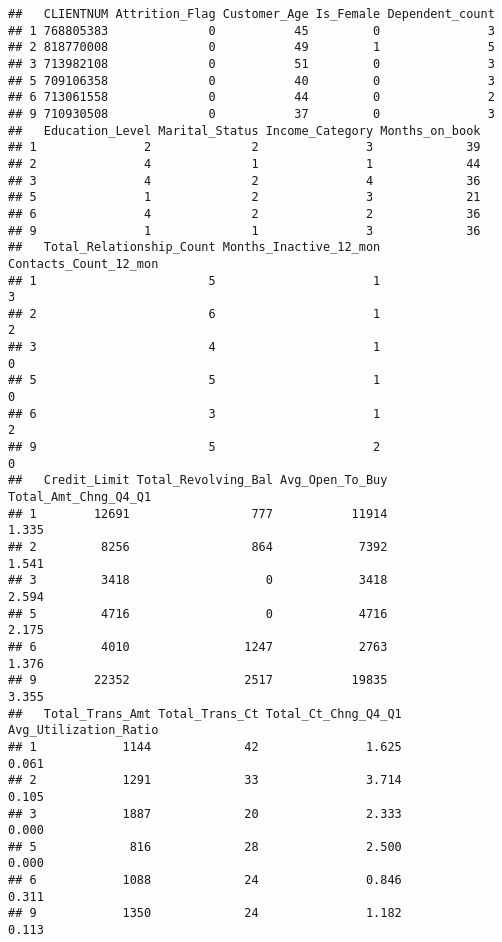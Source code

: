 \documentclass[
]{article}
\begin{document}
\begin{verbatim}
##   CLIENTNUM Attrition_Flag Customer_Age Is_Female Dependent_count
## 1 768805383              0           45         0               3
## 2 818770008              0           49         1               5
## 3 713982108              0           51         0               3
## 5 709106358              0           40         0               3
## 6 713061558              0           44         0               2
## 9 710930508              0           37         0               3
##   Education_Level Marital_Status Income_Category Months_on_book
## 1               2              2               3             39
## 2               4              1               1             44
## 3               4              2               4             36
## 5               1              2               3             21
## 6               4              2               2             36
## 9               1              1               3             36
##   Total_Relationship_Count Months_Inactive_12_mon Contacts_Count_12_mon
## 1                        5                      1                     3
## 2                        6                      1                     2
## 3                        4                      1                     0
## 5                        5                      1                     0
## 6                        3                      1                     2
## 9                        5                      2                     0
##   Credit_Limit Total_Revolving_Bal Avg_Open_To_Buy Total_Amt_Chng_Q4_Q1
## 1        12691                 777           11914                1.335
## 2         8256                 864            7392                1.541
## 3         3418                   0            3418                2.594
## 5         4716                   0            4716                2.175
## 6         4010                1247            2763                1.376
## 9        22352                2517           19835                3.355
##   Total_Trans_Amt Total_Trans_Ct Total_Ct_Chng_Q4_Q1 Avg_Utilization_Ratio
## 1            1144             42               1.625                 0.061
## 2            1291             33               3.714                 0.105
## 3            1887             20               2.333                 0.000
## 5             816             28               2.500                 0.000
## 6            1088             24               0.846                 0.311
## 9            1350             24               1.182                 0.113
\end{verbatim}
\end{document}

